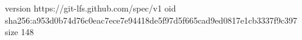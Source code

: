 version https://git-lfs.github.com/spec/v1
oid sha256:a953d0b74d76c0eac7ece7e94418de5f97d5f665cad9ed0817e1cb3337f9c397
size 148
